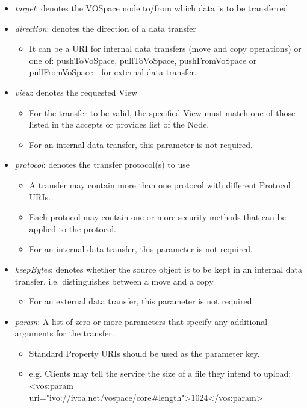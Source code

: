 \documentclass[11pt,a4paper]{ivoa}
\begin{document}
\begin{itemize}
    \item \emph{target}: denotes the VOSpace node to/from which data is to be transferred
    \item \emph{direction}: denotes the direction of a data transfer
        \begin{itemize}
            \item It can be a URI for internal data transfers (move and copy operations) or one of: pushToVoSpace, pullToVoSpace, pushFromVoSpace or pullFromVoSpace - for external data transfer.
        \end{itemize}
    \item \emph{view}: denotes the requested View
        \begin{itemize}
            \item For the transfer to be valid, the specified View must match one of those listed in the accepts or provides list of the Node.
            \item For an internal data transfer, this parameter is not required.
        \end{itemize}
    \item \emph{protocol}: denotes the transfer protocol(s) to use
        \begin{itemize}
            \item A transfer may contain more than one protocol with different Protocol URIs.
            \item Each protocol may contain one or more security methods that can be applied to the protocol.
            \item For an internal data transfer, this parameter is not required.
        \end{itemize}
    \item \emph{keepBytes}: denotes whether the source object is to be kept in an internal data transfer, i.e. distinguishes between a move and a copy
        \begin{itemize}
            \item For an external data transfer, this parameter is not required.
        \end{itemize}
    \item \emph{param}: A list of zero or more parameters that specify any additional arguments for the transfer.
        \begin{itemize}
            \item Standard Property URIs should be used as the parameter key.
            \item e.g. Clients may tell the service the size of a file they intend to upload: <vos:param uri="ivo://ivoa.net/vospace/core\#length">1024</vos:param>
        \end{itemize}
\end{itemize}
\end{document}
